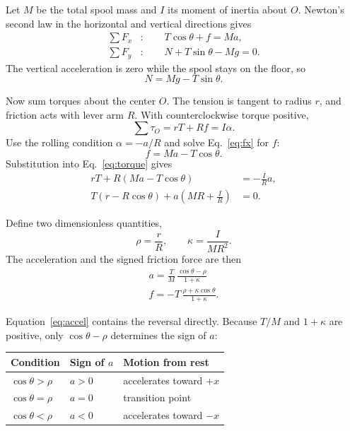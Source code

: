 \documentclass[11pt]{article}
\begin{document}
Let $M$ be the total spool mass and $I$ its moment of inertia about $O$. Newton's second law in the horizontal and vertical directions gives
\begin{align}
  \sum F_x &: \qquad T\cos\theta+f=Ma, \label{eq:fx}\\
  \sum F_y &: \qquad N+T\sin\theta-Mg=0. \label{eq:fy}
\end{align}
The vertical acceleration is zero while the spool stays on the floor, so
\begin{equation}
  N=Mg-T\sin\theta. \label{eq:normal}
\end{equation}

Now sum torques about the center $O$. The tension is tangent to radius $r$, and friction acts with lever arm $R$. With counterclockwise torque positive,
\begin{equation}
  \sum\tau_O=rT+Rf=I\alpha. \label{eq:torque}
\end{equation}
Use the rolling condition $\alpha=-a/R$ and solve Eq.~\eqref{eq:fx} for $f$:
\[
  f=Ma-T\cos\theta.
\]
Substitution into Eq.~\eqref{eq:torque} gives
\begin{align*}
  rT+R\left(Ma-T\cos\theta\right)&=-\frac{I}{R}a,\\
  T\left(r-R\cos\theta\right)
  +a\left(MR+\frac{I}{R}\right)&=0.
\end{align*}

Define two dimensionless quantities,
\[
  \rho=\frac{r}{R},
  \qquad
  \kappa=\frac{I}{MR^2}.
\]
The acceleration and the signed friction force are then
\begin{align}
  \boxed{\displaystyle
  a=\frac{T}{M}\,
  \frac{\cos\theta-\rho}{1+\kappa}}
  \label{eq:accel}\\[4pt]
  \boxed{\displaystyle
  f=-T\,
  \frac{\rho+\kappa\cos\theta}{1+\kappa}.}
  \label{eq:friction}
\end{align}

Equation~\eqref{eq:accel} contains the reversal directly. Because $T/M$ and $1+\kappa$ are positive, only $\cos\theta-\rho$ determines the sign of $a$:
\begin{center}
\begin{tabular}{@{}lll@{}}
\toprule
Condition & Sign of $a$ & Motion from rest\\
\midrule
$\cos\theta>\rho$ & $a>0$ & accelerates toward $+x$\\
$\cos\theta=\rho$ & $a=0$ & transition point\\
$\cos\theta<\rho$ & $a<0$ & accelerates toward $-x$\\
\bottomrule
\end{tabular}
\end{center}
\end{document}
